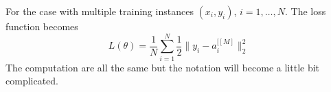 \documentclass[../main.tex]{subfiles}
\begin{document}
            For the case with multiple training instances $(x_i, y_i)$, $i=1,\dots,N$. The loss function becomes
            \[
                L(\theta) = \frac{1}{N} \sum_{i=1}^N \frac{1}{2} \|y_i - a_i^{[ [M] }\|_2^2    
            \]
            The computation are all the same but the notation will become a little bit complicated.
\end{document}

